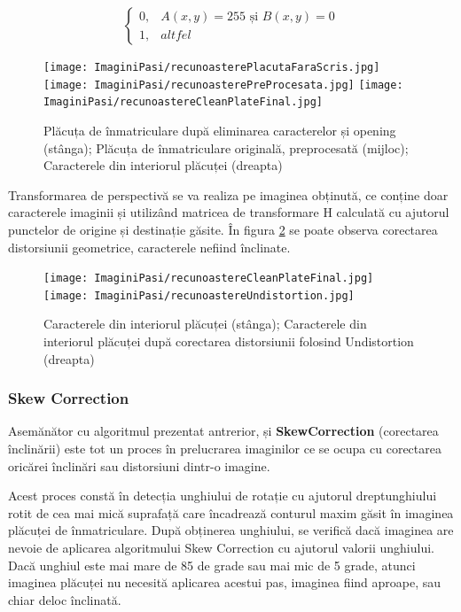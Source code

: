 \documentclass[12pt]{article}
\begin{document}
\begin{equation}
\begin{cases}
0, & A(x,y) = 255 \text{ și } B(x,y) = 0 \\
1, & altfel
\label{eq:bitwise}
\end{cases}
\end{equation}

\begin{figure}[H]
  \centering
  \texttt{[image: ImaginiPasi/recunoasterePlacutaFaraScris.jpg]}\hfill
    \texttt{[image: ImaginiPasi/recunoasterePreProcesata.jpg]}\hfill
    \texttt{[image: ImaginiPasi/recunoastereCleanPlateFinal.jpg]}
  \caption{Pl\u{a}cuța de \^{i}nmatriculare dup\u{a} eliminarea caracterelor și opening (st\^{a}nga); Pl\u{a}cuța de \^{i}nmatriculare original\u{a}, preprocesat\u{a} (mijloc); Caracterele din interiorul pl\u{a}cuței (dreapta)}
  \label{fig:recunoastere_bitwise}
\end{figure}

Transformarea de perspectiv\u{a} se va realiza pe imaginea obținut\u{a}, ce conține doar caracterele imaginii și utiliz\^{a}nd matricea de transformare H calculat\u{a} cu ajutorul punctelor de origine și destinație g\u{a}site. \^{I}n figura \ref{fig:recunoastere_rezultat} se poate observa corectarea distorsiunii geometrice, caracterele nefiind \^{i}nclinate.

\begin{figure}[H]
  \centering
  \texttt{[image: ImaginiPasi/recunoastereCleanPlateFinal.jpg]}\hfill
    \texttt{[image: ImaginiPasi/recunoastereUndistortion.jpg]}
  \caption{Caracterele din interiorul pl\u{a}cuței (st\^{a}nga); Caracterele din interiorul pl\u{a}cuței dup\u{a} corectarea distorsiunii folosind Undistortion (dreapta)}
  \label{fig:recunoastere_rezultat}
\end{figure}

\subsubsection{Skew Correction}

Asem\u{a}n\u{a}tor cu algoritmul prezentat antrerior,  și \textbf{SkewCorrection} (corectarea \^{i}nclin\u{a}rii) este tot un proces \^{i}n prelucrarea imaginilor ce se ocupa cu corectarea oric\u{a}rei \^{i}nclin\u{a}ri sau distorsiuni dintr-o imagine. 

Acest proces const\u{a} \^{i}n detecția unghiului de rotație cu ajutorul dreptunghiului rotit de cea mai mic\u{a} suprafaț\u{a} care \^{i}ncadreaz\u{a} conturul maxim g\u{a}sit \^{i}n imaginea pl\u{a}cuței de \^{i}nmatriculare. Dup\u{a} obținerea unghiului, se verific\u{a} dac\u{a} imaginea are nevoie de aplicarea algoritmului Skew Correction cu ajutorul valorii unghiului. Dac\u{a} unghiul este mai mare de 85 de grade sau mai mic de 5 grade, atunci imaginea pl\u{a}cuței nu necesit\u{a} aplicarea acestui pas, imaginea fiind aproape, sau chiar deloc \^{i}nclinat\u{a}.
\end{document}
